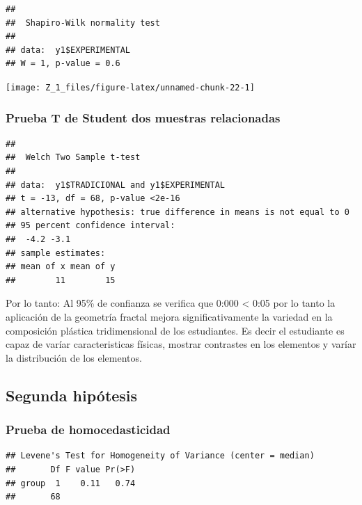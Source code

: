 \documentclass[12pt,]{report}
\begin{document}
\begin{verbatim}
## 
##  Shapiro-Wilk normality test
## 
## data:  y1$EXPERIMENTAL
## W = 1, p-value = 0.6
\end{verbatim}

\begin{center}\texttt{[image: Z\_1\_files/figure-latex/unnamed-chunk-22-1]} \end{center}

\hypertarget{prueba-t-de-student-dos-muestras-relacionadas}{%
\subsubsection{Prueba T de Student dos muestras relacionadas}\label{prueba-t-de-student-dos-muestras-relacionadas}}

\begin{verbatim}
## 
##  Welch Two Sample t-test
## 
## data:  y1$TRADICIONAL and y1$EXPERIMENTAL
## t = -13, df = 68, p-value <2e-16
## alternative hypothesis: true difference in means is not equal to 0
## 95 percent confidence interval:
##  -4.2 -3.1
## sample estimates:
## mean of x mean of y 
##        11        15
\end{verbatim}

Por lo tanto: Al 95\% de confianza se verifica que 0:000 \textless{} 0:05 por lo tanto la aplicación
de la geometría fractal mejora significativamente la variedad en la composición
plástica tridimensional de los estudiantes. Es decir el estudiante es capaz de varíar
caracteristicas físicas, mostrar contrastes en los elementos y varíar la distribución
de los elementos.

\hypertarget{segunda-hipuxf3tesis}{%
\subsection{Segunda hipótesis}\label{segunda-hipuxf3tesis}}

\hypertarget{prueba-de-homocedasticidad-1}{%
\subsubsection{Prueba de homocedasticidad}\label{prueba-de-homocedasticidad-1}}

\begin{verbatim}
## Levene's Test for Homogeneity of Variance (center = median)
##       Df F value Pr(>F)
## group  1    0.11   0.74
##       68
\end{verbatim}
\end{document}
